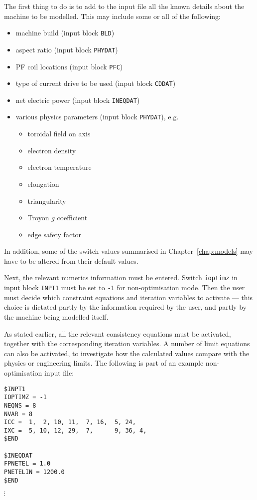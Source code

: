 The first thing to do is to add to the input file all the known details about
the machine to be modelled. This may include some or all of the following:
\begin{itemize}
\item machine build (input block {\tt BLD})
\item aspect ratio (input block {\tt PHYDAT})
\item PF coil locations (input block {\tt PFC})
\item type of current drive to be used (input block {\tt CDDAT})
\item net electric power (input block {\tt INEQDAT})
\item various physics parameters (input block {\tt PHYDAT}), e.g.
\begin{itemize}
\item toroidal field on axis
\item electron density
\item electron temperature
\item elongation
\item triangularity
\item Troyon $g$ coefficient
\item edge safety factor
\end{itemize}
\end{itemize}

In addition, some of the switch values summarised in Chapter~\ref{chap:models}
may have to be altered from their default values.

Next, the relevant numerics information must be entered. Switch {\tt ioptimz}
in input block {\tt INPT1} must be set to {\tt -1} for non-optimisation
mode. Then the user must decide which constraint equations and iteration
variables to activate --- this choice is dictated partly by the information
required by the user, and partly by the machine being modelled itself.

As stated earlier, all the relevant consistency equations must be activated,
together with the corresponding iteration variables. A number of limit
equations can also be activated, to investigate how the calculated values
compare with the physics or engineering limits.  The following is part of an
example non-optimisation input file:
\begin{verbatim}
$INPT1
IOPTIMZ = -1
NEQNS = 8
NVAR = 8
ICC =  1,  2, 10, 11,  7, 16,  5, 24,
IXC =  5, 10, 12, 29,  7,      9, 36, 4,
$END

$INEQDAT
FPNETEL = 1.0
PNETELIN = 1200.0
$END
\end{verbatim}
\vspace{-8mm}
$\vdots$

